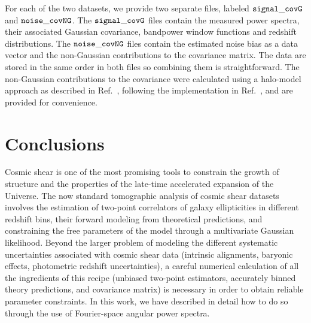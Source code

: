\documentclass[a4paper,11pt]{article}
\begin{document}
     For each of the two datasets, we provide two separate files, labeled ${\tt signal\_covG}$ and ${\tt noise\_covNG}$. The ${\tt signal\_covG}$ files contain the measured power spectra, their associated Gaussian covariance, bandpower window functions and redshift distributions. The ${\tt noise\_covNG}$ files contain the estimated noise bias as a data vector and the non-Gaussian contributions to the covariance matrix. The data are stored in the same order in both files so combining them is straightforward. The non-Gaussian contributions to the covariance were calculated using a halo-model approach as described in Ref.~\cite{1601.05779}, following the implementation in Ref.~\cite{2006.00008}, and are provided for convenience.


  \section{Conclusions}\label{sec:conclusion}
    Cosmic shear is one of the most promising tools to constrain the growth of structure and the properties of the late-time accelerated expansion of the Universe. The now standard tomographic analysis of cosmic shear datasets involves the estimation of two-point correlators of galaxy ellipticities in different redshift bins, their forward modeling from theoretical predictions, and constraining the free parameters of the model through a multivariate Gaussian likelihood. Beyond the larger problem of modeling the different systematic uncertainties associated with cosmic shear data (intrinsic alignments, baryonic effects, photometric redshift uncertainties), a careful numerical calculation of all the ingredients of this recipe (unbiased two-point estimators, accurately binned theory predictions, and covariance matrix) is necessary in order to obtain reliable parameter constraints. In this work, we have described in detail how to do so through the use of Fourier-space angular power spectra.
\end{document}
